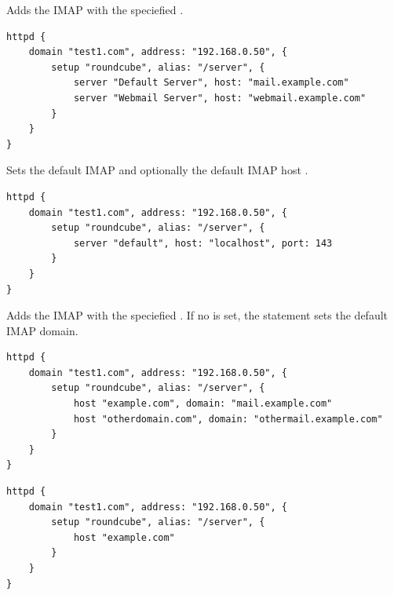 
Adds the IMAP  with the speciefied .

\begin{lstlisting}[style=Java]
httpd {
    domain "test1.com", address: "192.168.0.50", {
        setup "roundcube", alias: "/server", {
            server "Default Server", host: "mail.example.com"
            server "Webmail Server", host: "webmail.example.com"
        }
    }
}
\end{lstlisting}


Sets the default IMAP  and optionally the default IMAP host .

\begin{lstlisting}[style=Java]
httpd {
    domain "test1.com", address: "192.168.0.50", {
        setup "roundcube", alias: "/server", {
            server "default", host: "localhost", port: 143
        }
    }
}
\end{lstlisting}


Adds the IMAP  with the speciefied . If no 
is set, the statement sets the default IMAP domain.

\begin{lstlisting}[style=Java]
httpd {
    domain "test1.com", address: "192.168.0.50", {
        setup "roundcube", alias: "/server", {
            host "example.com", domain: "mail.example.com"
            host "otherdomain.com", domain: "othermail.example.com"
        }
    }
}
\end{lstlisting}

\begin{lstlisting}[style=Java]
httpd {
    domain "test1.com", address: "192.168.0.50", {
        setup "roundcube", alias: "/server", {
            host "example.com"
        }
    }
}
\end{lstlisting}


